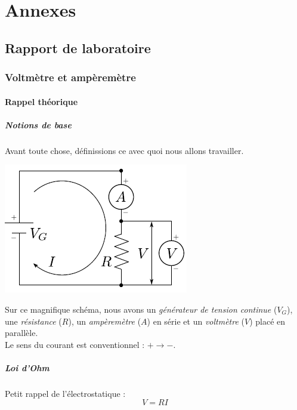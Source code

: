 \documentclass	[11pt, a4paper, openany]{book}
\begin{document}
\part{Annexes}
\appendix
\chapter{Rapport de laboratoire}
\section{Voltmètre et ampèremètre}
\subsection{Rappel théorique}
\subsubsection{Notions de base}
Avant toute chose, définissions ce avec quoi nous allons travailler.
\begin{center}
\includegraphics[scale=0.5]{labo/image8.png}
\end{center}
Sur ce magnifique schéma, nous avons un \textit{générateur de tension continue} ($V_G$), une \textit{résistance} ($R$), un \textit{ampèremètre} ($A$) en série et un \textit{voltmètre} ($V$) placé en parallèle.\\
Le sens du courant est conventionnel : $+ \rightarrow -$.

\subsubsection*{Loi d'Ohm}
Petit rappel de l'électrostatique :
\begin{equation}
V = RI
\end{equation}
\end{document}
